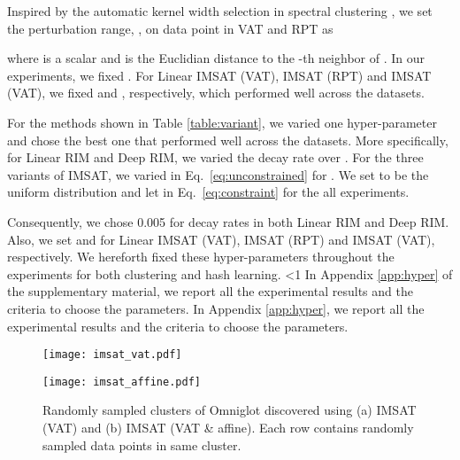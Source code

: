 \documentclass{article}
\theoremstyle{plain}
\newcounter{long}
\begin{document}
Inspired by the automatic kernel width selection in spectral clustering \citep{zelnik2004self}, we set the perturbation range, , on data point  in VAT and RPT as

where  is a scalar and  is the Euclidian distance to the -th neighbor of . In our experiments, we fixed . For Linear IMSAT (VAT), IMSAT (RPT) and IMSAT (VAT), we fixed  and , respectively, which performed well across the datasets.

For the methods shown in Table \ref{table:variant}, we varied one hyper-parameter and chose the best one that performed well across the datasets. 
More specifically, for Linear RIM and Deep RIM, we varied the decay rate over . For the three variants of IMSAT, we varied  in Eq.~\eqref{eq:unconstrained} for . We set  to be the uniform distribution and let  in Eq.~\eqref{eq:constraint} for the all experiments. 

Consequently, we chose 0.005 for decay rates in both Linear RIM and Deep RIM. Also, we set  and  for Linear IMSAT (VAT), IMSAT (RPT) and IMSAT (VAT), respectively. We hereforth fixed these hyper-parameters throughout the experiments for both clustering and hash learning. 
\ifnum\value{long}<1
In Appendix \ref{app:hyper} of the supplementary material, we report all the experimental results and the criteria to choose the parameters.
\else
In Appendix \ref{app:hyper}, we report all the experimental results and the criteria to choose the parameters.
\fi

\begin{figure*}[t]
\begin{minipage}[t]{0.5\hsize}
\begin{center}
\centerline{\texttt{[image: imsat\_vat.pdf]}}
\label{image}
\end{center}
\end{minipage}
\begin{minipage}[t]{0.5\hsize}
\begin{center}
\centerline{\texttt{[image: imsat\_affine.pdf]}}
\label{image}
\end{center}
\end{minipage}
\vspace{-1cm}
\caption{Randomly sampled clusters of Omniglot discovered using (a) IMSAT (VAT) and (b) IMSAT (VAT \& affine). Each row contains randomly sampled data points in same cluster.}\label{fig:omniglot}
\end{figure*} 
\end{document}
